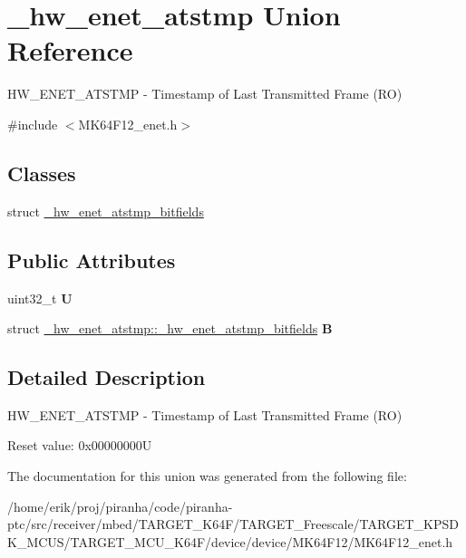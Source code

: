 \hypertarget{union__hw__enet__atstmp}{}\section{\+\_\+hw\+\_\+enet\+\_\+atstmp Union Reference}
\label{union__hw__enet__atstmp}


H\+W\+\_\+\+E\+N\+E\+T\+\_\+\+A\+T\+S\+T\+MP -\/ Timestamp of Last Transmitted Frame (RO)  




{\ttfamily \#include $<$M\+K64\+F12\+\_\+enet.\+h$>$}

\subsection*{Classes}
\begin{DoxyCompactItemize}
\item 
struct \hyperlink{struct__hw__enet__atstmp_1_1__hw__enet__atstmp__bitfields}{\+\_\+hw\+\_\+enet\+\_\+atstmp\+\_\+bitfields}
\end{DoxyCompactItemize}
\subsection*{Public Attributes}
\begin{DoxyCompactItemize}
\item 
uint32\+\_\+t {\bfseries U}\hypertarget{union__hw__enet__atstmp_af0960a062b60badc3a859e1da10bf07d}{}\label{union__hw__enet__atstmp_af0960a062b60badc3a859e1da10bf07d}

\item 
struct \hyperlink{struct__hw__enet__atstmp_1_1__hw__enet__atstmp__bitfields}{\+\_\+hw\+\_\+enet\+\_\+atstmp\+::\+\_\+hw\+\_\+enet\+\_\+atstmp\+\_\+bitfields} {\bfseries B}\hypertarget{union__hw__enet__atstmp_a9f14f821883aa8c08b4aa969c066ca33}{}\label{union__hw__enet__atstmp_a9f14f821883aa8c08b4aa969c066ca33}

\end{DoxyCompactItemize}


\subsection{Detailed Description}
H\+W\+\_\+\+E\+N\+E\+T\+\_\+\+A\+T\+S\+T\+MP -\/ Timestamp of Last Transmitted Frame (RO) 

Reset value\+: 0x00000000U 

The documentation for this union was generated from the following file\+:\begin{DoxyCompactItemize}
\item 
/home/erik/proj/piranha/code/piranha-\/ptc/src/receiver/mbed/\+T\+A\+R\+G\+E\+T\+\_\+\+K64\+F/\+T\+A\+R\+G\+E\+T\+\_\+\+Freescale/\+T\+A\+R\+G\+E\+T\+\_\+\+K\+P\+S\+D\+K\+\_\+\+M\+C\+U\+S/\+T\+A\+R\+G\+E\+T\+\_\+\+M\+C\+U\+\_\+\+K64\+F/device/device/\+M\+K64\+F12/M\+K64\+F12\+\_\+enet.\+h\end{DoxyCompactItemize}
